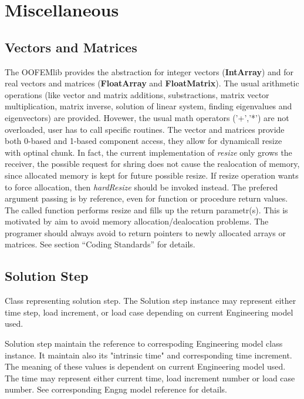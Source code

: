 \documentclass[a4paper]{article}
\newcommand{\class}[1]{{\bf #1}}
\newcommand{\service}[1]{{\em #1}}
\begin{document}
\section{Miscellaneous}
\subsection{Vectors and Matrices}
The OOFEMlib provides the abstraction for integer vectors (\class{IntArray})
and for real vectors and matrices (\class{FloatArray} and
\class{FloatMatrix}). The usual arithmetic operations (like vector and
matrix additions, substractions, matrix vector multiplication, matrix
inverse, solution of linear system, finding eigenvalues and
eigenvectors) are provided. Hovewer, the usual math operators ('+','*')
are not overloaded, user has to call specific routines. 
The vector and matrices provide both 0-based and 1-based component
access, they allow for dynamicall resize with optinal chunk. In fact,
the current implementation of \service{resize} only grows the
receiver, the possible request for shring does not cause the
realocation of memory, since allocated memory is kept for future possible resize. If
resize operation wants to force allocation, then \service{hardResize}
should be invoked instead. 
The prefered argument passing is by reference, even for function or
procedure return values.
The called function performs resize and fills up
the return parametr(s). This is motivated by aim to avoid memory
allocation/dealocation problems. The programer should always avoid to
return pointers to newly allocated arrays or matrices. 
See section ``Coding Standards'' for
details.

\subsection{Solution Step} 
Class representing solution step. The Solution step instance may represent either 
time step, load increment, or load case depending on current Engineering model used.

Solution step maintain the reference to correspoding Engineering model class instance.
It maintain also its "intrinsic time" and corresponding time increment. The meaning of these 
values is dependent on current Engineering model used. The time may represent either
current time, load increment number or load case number. See corresponding 
Engng model reference for details.
	
\end{document}
